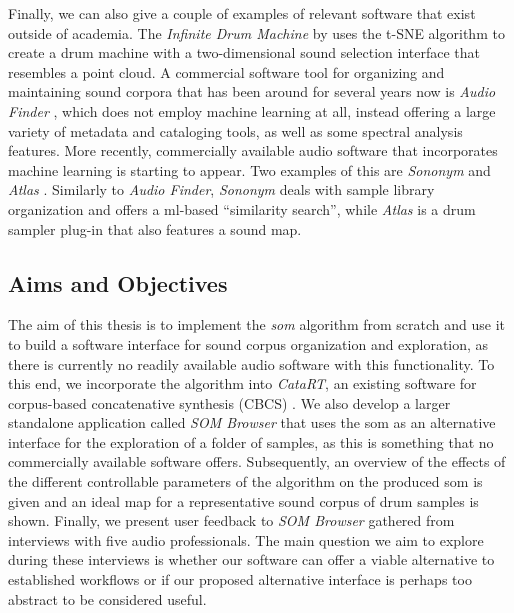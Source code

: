 Finally, we can also give a couple of examples of relevant software that exist
outside of academia. The \textit{Infinite Drum Machine} by \citet{mcdonald2017}
uses the t-SNE algorithm \citep{maaten2008} to create a drum machine with a
two-dimensional sound selection interface that resembles a point cloud. A
commercial software tool for organizing and maintaining sound corpora that has
been around for several years now is \textit{Audio Finder}
\citep{audiofinder2019}, which does not employ machine learning at all, instead
offering a large variety of metadata and cataloging tools, as well as some
spectral analysis features. More recently, commercially available audio software
that incorporates machine learning is starting to appear. Two examples of this
are \textit{Sononym} \citep{nielsen2018} and \textit{Atlas} \citep{atlas2018}.
Similarly to \textit{Audio Finder}, \textit{Sononym} deals with sample library
organization and offers a \gls{ml}-based ``similarity search'', while
\textit{Atlas} is a drum sampler plug-in that also features a sound map.

\subsection{Aims and Objectives}
\label{subsec:aims}
The aim of this thesis is to implement the \textit{\gls{som}} algorithm from
scratch and use it to build a software interface for sound corpus organization
and exploration, as there is currently no readily available audio software with
this functionality. To this end, we incorporate the algorithm into
\textit{CataRT}, an existing software for corpus-based concatenative synthesis
(CBCS) \citep{schwarz2006}. We also develop a larger standalone application
called \textit{SOM Browser} that uses the \gls{som} as an alternative interface
for the exploration of a folder of samples, as this is something that no
commercially available software offers. Subsequently, an overview of the effects
of the different controllable parameters of the algorithm on the produced
\gls{som} is given and an ideal map for a representative sound corpus of drum
samples is shown. Finally, we present user feedback to \textit{SOM Browser}
gathered from interviews with five audio professionals. The main question we aim
to explore during these interviews is whether our software can offer a viable
alternative to established workflows or if our proposed alternative interface is
perhaps too abstract to be considered useful.
